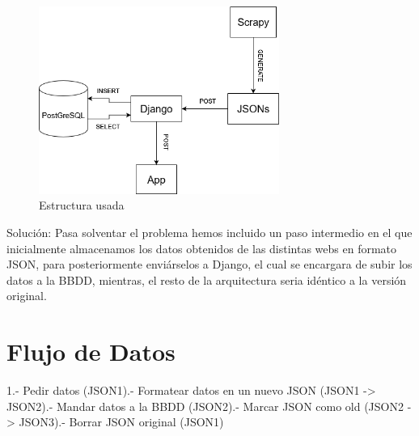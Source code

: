 \begin{figure} [H]
	\centering
	\includegraphics[width=0.7\textwidth]{fig/estructura_usada.png}
	\caption[Estructura de datos usada en el proyecto]{Estructura usada}
	\label{fig:ej10}
\end{figure}

Solución: Pasa solventar el problema hemos incluido un paso intermedio en el que inicialmente almacenamos los datos obtenidos de las distintas webs en formato JSON, para posteriormente enviárselos a Django, el cual se encargara de subir los datos a la BBDD, mientras, el resto de la arquitectura seria idéntico a la versión original.

\section{Flujo de Datos}
1.- Pedir datos (JSON1).- Formatear datos en un nuevo JSON (JSON1 -> JSON2).- Mandar datos a la BBDD (JSON2).- Marcar JSON como old (JSON2 -> JSON3).- Borrar JSON original (JSON1)\newline

